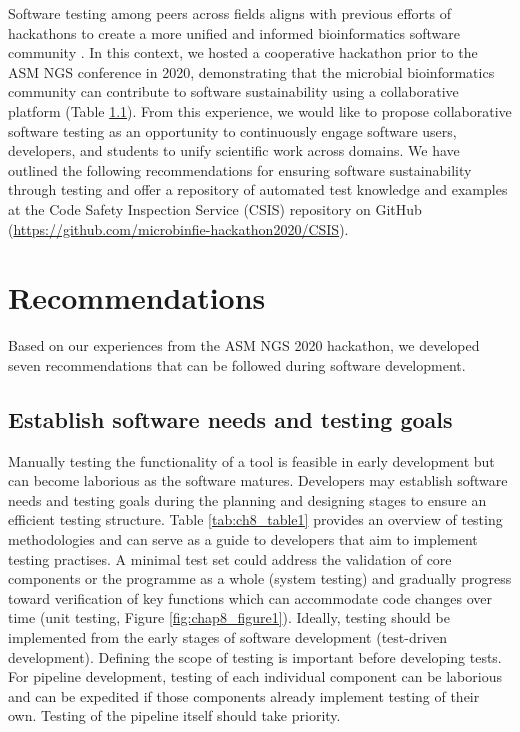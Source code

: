 Software testing among peers across fields aligns with previous efforts of hackathons to create a more unified and informed bioinformatics software community \cite{busby_closing_2016}. In this context, we hosted a cooperative hackathon prior to the ASM NGS conference in 2020, demonstrating that the microbial bioinformatics community can contribute to software sustainability using a collaborative platform (Table \ref{}). From this experience, we would like to propose collaborative software testing as an opportunity to continuously engage software users, developers, and students to unify scientific work across domains. We have outlined the following recommendations for ensuring software sustainability through testing and offer a repository of automated test knowledge and examples at the Code Safety Inspection Service (CSIS) repository on GitHub (\url{https://github.com/microbinfie-hackathon2020/CSIS}).

\section{Recommendations}

Based on our experiences from the ASM NGS 2020 hackathon, we developed seven recommendations that can be followed during software development.

\subsection{Establish software needs and testing goals}

Manually testing the functionality of a tool is feasible in early development but can become laborious as the software matures. Developers may establish software needs and testing goals during the planning and designing stages to ensure an efficient testing structure. Table \ref{tab:ch8_table1} provides an overview of testing methodologies and can serve as a guide to developers that aim to implement testing practises. A minimal test set could address the validation of core components or the programme as a whole (system testing) and gradually progress toward verification of key functions which can accommodate code changes over time (unit testing, Figure \ref{fig:chap8_figure1}). Ideally, testing should be implemented from the early stages of software development (test-driven development). Defining the scope of testing is important before developing tests. For pipeline development, testing of each individual component can be laborious and can be expedited if those components already implement testing of their own. Testing of the pipeline itself should take priority.

